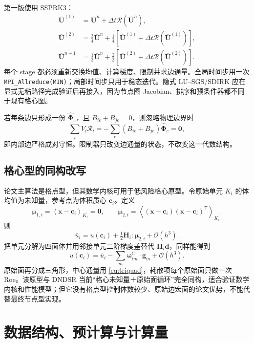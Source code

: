 \documentclass[UTF8,a4paper,11pt,openany]{ctexrep}
\numberwithin{equation}{chapter}
\newcommand{\Order}{\mathcal O}
\newcommand{\avg}[1]{\left\langle #1\right\rangle}
\newcommand{\Ubar}{\overline{\bm U}}
\newcommand{\RHS}{\mathcal R}
\newcommand{\transpose}{\mathsf T}
\newcommand{\pathcode}[1]{\nolinkurl{#1}}
\begin{document}
第一版使用 SSPRK3：
\begin{align}
 \Ubar^{(1)}&=\Ubar^n+\Delta t\RHS(\Ubar^n),\\
 \Ubar^{(2)}&=\tfrac34\Ubar^n+\tfrac14\left[\Ubar^{(1)}+\Delta t\RHS(\Ubar^{(1)})\right],\\
 \Ubar^{n+1}&=\tfrac13\Ubar^n+\tfrac23\left[\Ubar^{(2)}+\Delta t\RHS(\Ubar^{(2)})\right].
\end{align}
每个 stage 都必须重新交换均值、计算梯度、限制并求边通量。全局时间步用一次 \pathcode{MPI_Allreduce(MIN)}；局部时间步只用于稳态迭代。隐式 LU--SGS/SDIRK 应在显式无粘路径完成验证后再接入，因为节点图 Jacobian、排序和预条件器都不同于现有格心图。

若每条边只形成一份 $\widehat{\bm\Phi}_e$，且 $B_{ie}+B_{je}=0$，则忽略物理边界时
\begin{equation}
  \sum_iV_i\RHS_i
  =-\sum_e(B_{ie}+B_{je})\widehat{\bm\Phi}_e=\bm0,
\end{equation}
即内部边严格成对守恒。限制器只改变边通量的状态，不改变这一代数结构。

\section{格心型的同构改写}

论文主算法是格点型，但其数学内核可用于低风险格心原型。令原始单元 $K_i$ 的体均值为未知量，参考点为体积质心 $\bm c_i$。定义
\begin{equation}
  \bm\mu_{1,i}=\avg{\bm x-\bm c_i}_{K_i}=\bm0,
  \qquad
  \bm\mu_{2,i}=\avg{(\bm x-\bm c_i)(\bm x-\bm c_i)^{\transpose}}_{K_i}.
\end{equation}
则
\begin{equation}
  \bar u_i=u(\bm c_i)+\tfrac12\bm H_i:\bm\mu_{2,i}+\Order(h^3).
\end{equation}
把单元分解为四面体并用邻接单元二阶梯度差替代 $\bm H_i\bm d$，同样能得到
\begin{equation}
  u(\bm c_i)=\bar u_i-\sum_m\bm\omega^{C}_{im}\cdot\bm g_m+\Order(h^3).
\end{equation}
原始面再分成三角形，中心通量用 \cref{eq:triquad}，耗散项每个原始面只做一次 Roe。该原型与 DNDSR 当前“格心未知量＋原始面循环”完全同构，适合验证数学内核和性能模型；但它没有格点型控制体数较少、原始边宏面的论文优势，不能代替最终节点型实现。

\chapter{数据结构、预计算与计算量}
\end{document}

